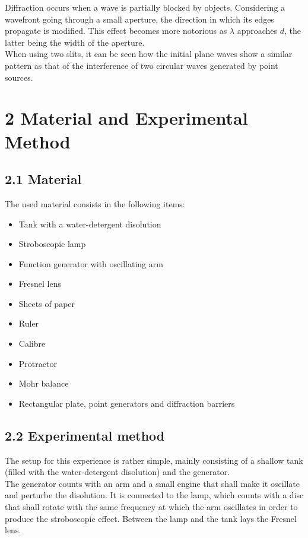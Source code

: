\documentclass[a4paper, 12pt]{article}
\begin{document}
		Diffraction occurs when a wave is partially blocked by objects. Considering a wavefront going through a small aperture, the direction in which its edges propagate is modified. This effect becomes more notorious as $\lambda$ approaches $d$, the latter being the width of the aperture. \\
		
		When using two slits, it can be seen how the initial plane waves show a similar pattern as that of the interference of two circular waves generated by point sources. 
	\section{2 Material and Experimental Method}
	\subsection{2.1 Material}
	The used material consists in the following items:
	\begin{itemize}
		\item Tank with a water-detergent disolution
		\item Stroboscopic lamp
		\item Function generator with oscillating arm
		\item Fresnel lens
		\item Sheets of paper
		\item Ruler
		\item Calibre
		\item Protractor
		\item Mohr balance
		\item Rectangular plate, point generators and diffraction barriers
	
	\end{itemize}
	
	\subsection{2.2 Experimental method}
	The setup for this experience is rather simple, mainly consisting of a shallow tank (filled with the water-detergent disolution) and the generator.\\
	
	The generator counts with an arm and a small engine that shall make it oscillate and perturbe the disolution. It is connected to the lamp, which counts with a disc that shall rotate with the same frequency at which the arm oscillates in order to produce the stroboscopic effect. Between the lamp and the tank lays the Fresnel lens. \\
	
\end{document}
